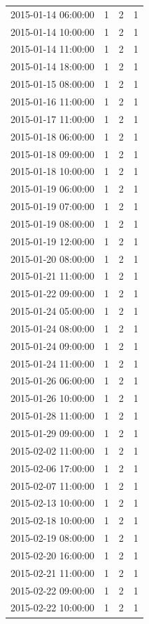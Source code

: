\begin{tabular}{lrrr}
2015-01-14 06:00:00 & 1 & 2 & 1 \\
2015-01-14 10:00:00 & 1 & 2 & 1 \\
2015-01-14 11:00:00 & 1 & 2 & 1 \\
2015-01-14 18:00:00 & 1 & 2 & 1 \\
2015-01-15 08:00:00 & 1 & 2 & 1 \\
2015-01-16 11:00:00 & 1 & 2 & 1 \\
2015-01-17 11:00:00 & 1 & 2 & 1 \\
2015-01-18 06:00:00 & 1 & 2 & 1 \\
2015-01-18 09:00:00 & 1 & 2 & 1 \\
2015-01-18 10:00:00 & 1 & 2 & 1 \\
2015-01-19 06:00:00 & 1 & 2 & 1 \\
2015-01-19 07:00:00 & 1 & 2 & 1 \\
2015-01-19 08:00:00 & 1 & 2 & 1 \\
2015-01-19 12:00:00 & 1 & 2 & 1 \\
2015-01-20 08:00:00 & 1 & 2 & 1 \\
2015-01-21 11:00:00 & 1 & 2 & 1 \\
2015-01-22 09:00:00 & 1 & 2 & 1 \\
2015-01-24 05:00:00 & 1 & 2 & 1 \\
2015-01-24 08:00:00 & 1 & 2 & 1 \\
2015-01-24 09:00:00 & 1 & 2 & 1 \\
2015-01-24 11:00:00 & 1 & 2 & 1 \\
2015-01-26 06:00:00 & 1 & 2 & 1 \\
2015-01-26 10:00:00 & 1 & 2 & 1 \\
2015-01-28 11:00:00 & 1 & 2 & 1 \\
2015-01-29 09:00:00 & 1 & 2 & 1 \\
2015-02-02 11:00:00 & 1 & 2 & 1 \\
2015-02-06 17:00:00 & 1 & 2 & 1 \\
2015-02-07 11:00:00 & 1 & 2 & 1 \\
2015-02-13 10:00:00 & 1 & 2 & 1 \\
2015-02-18 10:00:00 & 1 & 2 & 1 \\
2015-02-19 08:00:00 & 1 & 2 & 1 \\
2015-02-20 16:00:00 & 1 & 2 & 1 \\
2015-02-21 11:00:00 & 1 & 2 & 1 \\
2015-02-22 09:00:00 & 1 & 2 & 1 \\
2015-02-22 10:00:00 & 1 & 2 & 1 \\

\end{tabular}
